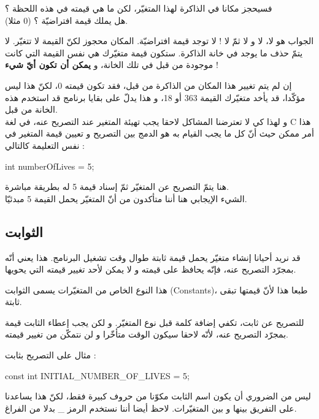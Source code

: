 فسيحجز مكانا في الذاكرة لهذا المتغيّر، لكن ما هي قيمته في هذه اللحظة ؟\\
هل يملك قيمة افتراضيّة ؟ (0 مثلا).

الجواب هو لا، لا و لا ثمّ لا ! لا توجد قيمة افتراضيّة. المكان محجوز لكنّ القيمة لا تتغيّر. لا يتمّ حذف ما يوجد في خانة الذاكرة. ستكون قيمة متغيّرك هي نفس القيمة التي كانت موجودة من قبل في تلك الخانة، و
\textbf{يمكن أن تكون أيّ شيء} !

إن لم يتم تغيير هذا المكان من الذاكرة من قبل، فقد تكون قيمته 0، لكنّ هذا ليس مؤكّدا، قد يأخد متغيّرك القيمة 363 أو 18، و هذا يدلّ على بقايا برنامج قد استخدم هذه الخانة من قبل.\\
و لهذا كي لا تعترضنا المشاكل لاحقا يجب تهيئة المتغير عند التصريح عنه، في لغة
\textenglish{C}
هذا أمر ممكن حيث أنّ كل ما يجب القيام به هو الدمج بين التصريح و تعيين قيمة المتغير في نفس التعليمة كالتالي :

\begin{Csource}
int numberOfLives = 5;
\end{Csource}

هنا يتمّ  التصريح عن المتغيّر ثمّ إسناد قيمة 5 له بطريقة مباشرة.\\
الشيء الإيجابي هنا أننا متأكدون من أنّ المتغيّر يحمل القيمة 5 مبدئيّا.

\subsection{الثوابت}

قد نريد أحيانا إنشاء متغيّر يحمل قيمة ثابتة طوال وقت تشغيل البرنامج. هذا يعني أنّه بمجرّد التصريح عنه، فإنّه يحافظ على قيمته و لا يمكن لأحد تغيير قيمته التي يحويها.

هذا النوع الخاص من المتغيّرات يسمى الثوابت (\textenglish{Constants})، طبعا هذا لأنّ قيمتها تبقى ثابتة.

للتصريح عن ثابت، تكفي إضافة كلمة
قبل نوع المتغيّر. و لكن يجب إعطاء الثابت قيمة بمجرّد التصريح عنه، لأنّه لاحقا سيكون الوقت متأخّرا و لن نتمكّن من تغيير قيمته.

مثال على التصريح بثابت :

\begin{Csource}
const int INITIAL_NUMBER_OF_LIVES = 5;
\end{Csource}

\begin{information}
  ليس من الضروري أن يكون اسم الثابت مكوّنا من حروف كبيرة فقط، لكنّ هذا يساعدنا على التفريق بينها و بين المتغيّرات. لاحظ أيضا أننا نستخدم الرمز
\_
 بدلا من الفراغ.
\end{information}

